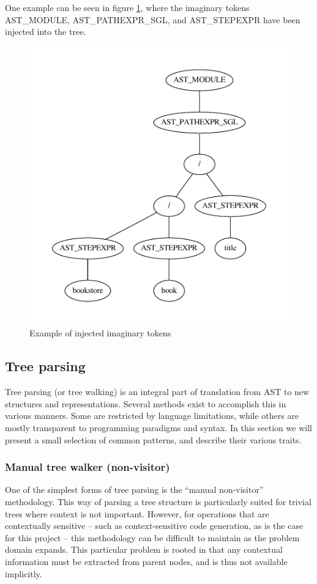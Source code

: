 One example can be seen in figure \ref{figure:parser:imaginary_tokens_path},
where the imaginary tokens AST\_MODULE, AST\_PATHEXPR\_SGL, and AST\_STEPEXPR
have been injected into the tree.

\begin{figure}[h]
  \centering
    \includegraphics[scale=0.50]{img/graphs/path1} 
  \caption{Example of injected imaginary tokens}
  \label{figure:parser:imaginary_tokens_path}
\end{figure}

\subsection{Tree parsing}
\label{sect:theory:parser:tree_parsing}
Tree parsing (or tree walking) is an integral part of translation from AST to
new structures and representations. Several methods exist to accomplish this in
various manners. Some are restricted by language limitations, while others are
mostly transparent to programming paradigms and syntax. In this section we will
present a small selection of common patterns, and describe their various traits.

\subsubsection{Manual tree walker (non-visitor)}
\label{sect:theory:manual_walker}
One of the simplest forms of tree parsing is the ``manual non-visitor''
methodology. This way of parsing a tree structure is particularly suited for
trivial trees where context is not important. However, for operations that are
contextually sensitive -- such as context-sensitive code generation, as is the
case for this project -- this methodology can be difficult to maintain as the
problem domain expands. This particular problem is rooted in that any
contextual information must be extracted from parent nodes, and is thus not
available implicitly.

